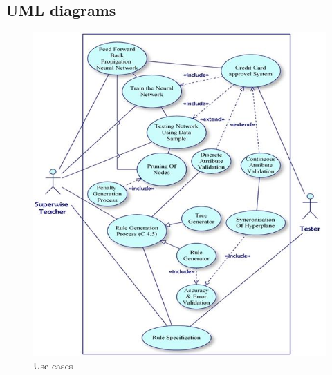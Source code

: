 \documentclass[a4paper,14pt,onecolumn]{article}
\begin{document}
\subsection{UML diagrams}

\begin{figure}
\begin{center}
\includegraphics[scale=0.5mm]
{UseCaseForReport.jpg} 
\caption{Use cases}
\end{center}
\end{figure}
\end{document}
